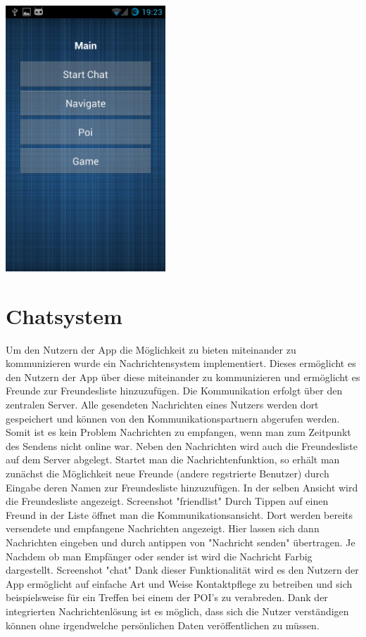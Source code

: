 \begin{capfigure}
	\includegraphics[width=6cm]{images/app/main_menu}
\end{capfigure}

\section{Chatsystem}
Um den Nutzern der App die Möglichkeit zu bieten miteinander zu kommunizieren wurde ein Nachrichtensystem implementiert. Dieses ermöglicht es den Nutzern der App über diese miteinander zu kommunizieren und ermöglicht es Freunde zur Freundesliste hinzuzufügen. 
Die Kommunikation erfolgt über den zentralen Server. Alle gesendeten Nachrichten eines Nutzers werden dort gespeichert und können von den Kommunikationspartnern abgerufen werden. Somit ist es kein Problem Nachrichten zu empfangen, wenn man zum Zeitpunkt des Sendens nicht online war. Neben den Nachrichten wird auch die Freundesliste auf dem Server abgelegt.
Startet man die Nachrichtenfunktion, so erhält man zunächst die Möglichkeit neue Freunde (andere regstrierte Benutzer) durch Eingabe deren Namen zur Freundesliste hinzuzufügen. In der selben Ansicht wird die Freundesliste angezeigt. 
\TODO Screenshot "friendlist"
Durch Tippen auf einen Freund in der Liste öffnet man die Kommunikationsansicht. Dort werden bereits versendete und empfangene Nachrichten angezeigt. Hier lassen sich dann Nachrichten eingeben und durch antippen von "Nachricht senden" übertragen. Je Nachdem ob man Empfänger oder sender ist wird die Nachricht Farbig dargestellt.
\TODO Screenshot "chat"
Dank dieser Funktionalität wird es den Nutzern der App ermöglicht auf einfache Art und Weise Kontaktpflege zu betreiben und sich beispielsweise für ein Treffen bei einem der POI's zu verabreden. Dank der integrierten Nachrichtenlösung ist es möglich, dass sich die Nutzer verständigen können ohne irgendwelche persönlichen Daten veröffentlichen zu müssen.

